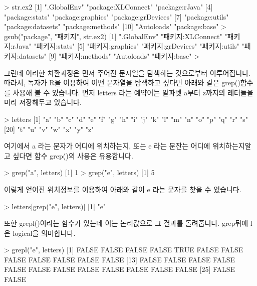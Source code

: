 \begin{Schunk}
\begin{Soutput} 
> str.ex2
 [1] ".GlobalEnv"        "package:XLConnect" "package:rJava"    
 [4] "package:stats"     "package:graphics"  "package:grDevices"
 [7] "package:utils"     "package:datasets"  "package:methods"  
[10] "Autoloads"         "package:base"     
> gsub("package", "패키지", str.ex2)
 [1] ".GlobalEnv"       "패키지:XLConnect" "패키지:rJava"     "패키지:stats"    
 [5] "패키지:graphics"  "패키지:grDevices" "패키지:utils"     "패키지:datasets" 
 [9] "패키지:methods"   "Autoloads"        "패키지:base"     
> 
\end{Soutput}
\end{Schunk}

그런데 이러한 치환과정은 먼저 주어진 문자열을 탐색하는 것으로부터 이루어집니다.
따라서, 독자가 R을 이용하여 어떤 문자열을 탐색하고 싶다면 아래와 같은 grep()함수를 사용해 볼 수 있습니다. 
먼저 letters 라는 예약어는 알파벳 a부터 z까지의 레터들을 미리 저장해두고 있습니다. 

\begin{Schunk}
\begin{Soutput} 
> letters
 [1] "a" "b" "c" "d" "e" "f" "g" "h" "i" "j" "k" "l" "m" "n" "o" "p" "q" "r" "s"
[20] "t" "u" "v" "w" "x" "y" "z"
\end{Soutput}
\end{Schunk}

여기에서 a 라는 문자가 어디에 위치하는지, 또는 e 라는 문잔는 어디에 위치하는지알고 싶다면 함수 grep()의 사용은 유용합니다.
\begin{Schunk}
\begin{Soutput} 
> grep("a", letters)
[1] 1
> grep("e", letters)
[1] 5
\end{Soutput}
\end{Schunk}
이렇게 얻어진 위치정보를 이용하여 아래와 같이 e 라는 문자를 찾을 수 있습니다. 

\begin{Schunk}
\begin{Soutput} 
> letters[grep("e", letters)]
[1] "e"
\end{Soutput}
\end{Schunk}

또한 grepl()이라는 함수가 있는데 이는 논리값으로 그 결과를 돌려줍니다. 
grep뒤에 l은 logical을 의미합니다.

\begin{Schunk}
\begin{Soutput} 
> grepl("e", letters)
 [1] FALSE FALSE FALSE FALSE  TRUE FALSE FALSE FALSE FALSE FALSE FALSE FALSE
[13] FALSE FALSE FALSE FALSE FALSE FALSE FALSE FALSE FALSE FALSE FALSE FALSE
[25] FALSE FALSE
\end{Soutput}
\end{Schunk}


